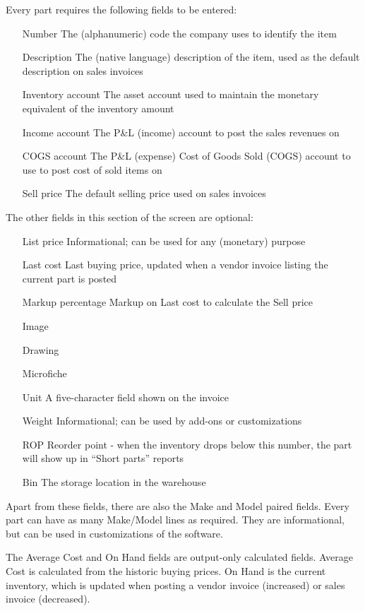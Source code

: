Every part requires the following fields to be entered:

\begin{itemize}
\item [Number] The (alphanumeric) code the company uses to identify the item
\item [Description] The (native language) description of the item, used as the default
	description on sales invoices
\item [Inventory account] The asset account used to maintain the monetary equivalent
	of the inventory amount
\item [Income account] The P\&L (income) account to post the sales revenues on
\item [COGS account] The P\&L (expense) Cost of Goods Sold (COGS) account to use
	to post cost of sold items on
\item [Sell price] The default selling price used on sales invoices
\end{itemize}


The other fields in this section of the screen are optional:

\begin{itemize}
\item [List price] Informational; can be used for any (monetary) purpose
\item [Last cost] Last buying price, updated when a vendor invoice listing the current part
    is posted
\item [Markup percentage] Markup on Last cost to calculate the Sell price
\item [Image]
\item [Drawing]
\item [Microfiche]
\item [Unit] A five-character field shown on the invoice
\item [Weight] Informational; can be used by add-ons or customizations
\item [ROP] Reorder point - when the inventory drops below this number,
     the part will show up in ``Short parts'' reports
\item [Bin] The storage location in the warehouse
\end{itemize}


Apart from these fields, there are also the Make and Model paired fields. Every part
can have as many Make/Model lines as required. They are informational, but can be used
in customizations of the software.

The Average Cost and On Hand fields are output-only calculated fields. Average Cost is
calculated from the historic buying prices. On Hand is the current inventory, which is
updated when posting a vendor invoice (increased) or sales invoice (decreased).



